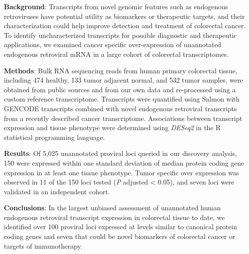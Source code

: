 \textbf{Background}:
Transcripts from novel genomic features such as endogenous retroviruses have potential utility as biomarkers or therapeutic targets, and their characterization could help improve detection and treatment of colorectal cancer.
To identify uncharacterized transcripts for possible diagnostic and therapeutic applications, we examined cancer specific over-expression of unannotated endogenous retroviral mRNA in a large cohort of colorectal transcriptomes.

\textbf{Methods}:
Bulk RNA sequencing reads from human primary colorectal tissue, including 474 healthy, 133 tumor adjacent normal, and 532 tumor samples, were obtained from public sources and from our own data and re-processed using a custom reference transcriptome.
Transcripts were quantified using Salmon with GENCODE transcripts combined with novel endogenous retroviral transcripts from a recently described cancer transcriptome.
Associations between transcript expression and tissue phenotype were determined using \emph{DESeq2} in the R statistical programming language.

\textbf{Results}:
Of 5,025 unannotated proviral loci queried in our discovery analysis, 150 were expressed within one standard deviation of median protein coding gene expression in at least one tissue phenotype.
Tumor specific over expression was observed in 11 of the 150 loci tested (\emph{P} adjusted < 0.05), and seven loci were validated in an independent cohort.

\textbf{Conclusions}:
In the largest unbiased assessment of unannotated human endogenous retroviral transcript expression in colorectal tissue to date, we identified over 100 proviral loci expressed at levels similar to canonical protein coding genes and seven that could be novel biomarkers of colorectal cancer or targets of immunotherapy.
